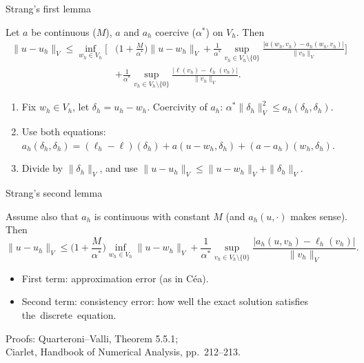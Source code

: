 \begin{frame}{Strang's first lemma}
    \begin{lemma}
        Let $a$ be continuous ($M$), $a$ and $a_h$ coercive ($\alpha^*$) on $V_h$. Then
        \begin{align*}
            \|u - u_h\|_V \le \inf_{w_h \in V_h} \Big[ & \Big(1 + \frac{M}{\alpha^*}\Big) \|u - w_h\|_V
                                                     + \frac{1}{\alpha^*} \sup_{v_h \in V_h\setminus\{0\}} \frac{|a(w_h,v_h) - a_h(w_h,v_h)|}{\|v_h\|_V} \Big] \\
             & + \frac{1}{\alpha^*} \sup_{v_h \in V_h\setminus\{0\}} \frac{|\ell(v_h) - \ell_h(v_h)|}{\|v_h\|_V}.
        \end{align*}
    \end{lemma}
    \begin{proofsteps}
        \begin{enumerate}
            \item Fix $w_h \in V_h$, let $\delta_h = u_h - w_h$. Coercivity of $a_h$: $\alpha^* \|\delta_h\|_V^2 \le a_h(\delta_h, \delta_h)$.
            \item Use both equations:
                  $a_h(\delta_h,\delta_h) = (\ell_h - \ell)(\delta_h) + a(u - w_h, \delta_h) + (a - a_h)(w_h, \delta_h)$.
            \item Divide by $\|\delta_h\|_V$, and use $\|u - u_h\|_V \le \|u - w_h\|_V + \|\delta_h\|_V$.
        \end{enumerate}
    \end{proofsteps}
\end{frame}

\begin{frame}{Strang's second lemma}
    \begin{lemma}
        Assume also that $a_h$ is continuous with constant $M$ (and $a_h(u, \cdot)$ makes sense). Then
        \[
            \|u - u_h\|_V \le \Big(1 + \frac{M}{\alpha^*}\Big) \inf_{w_h \in V_h} \|u - w_h\|_V
            + \frac{1}{\alpha^*} \sup_{v_h \in V_h \setminus\{0\}} \frac{|a_h(u, v_h) - \ell_h(v_h)|}{\|v_h\|_V}.
        \]
    \end{lemma}
    \begin{itemize}
        \item First term: \alert{approximation} error (as in Céa).
        \item Second term: \alert{consistency} error: how well the exact solution satisfies \mbox{the discrete equation.}
    \end{itemize}
    \medskip
    {\small Proofs: Quarteroni--Valli, Theorem 5.5.1;\\ Ciarlet, Handbook of Numerical Analysis, pp.~212--213.}
\end{frame}

